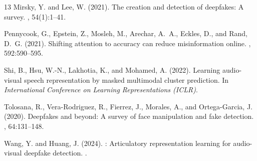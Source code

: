 \documentclass[11pt,a4paper]{article}
\begin{document}
\begin{thebibliography}{13}
Mirsky, Y. and Lee, W. (2021).
\newblock The creation and detection of deepfakes: A survey.
, 54(1):1--41.

Pennycook, G., Epstein, Z., Mosleh, M., Arechar, A.~A., Eckles, D., and Rand, D.~G. (2021).
\newblock Shifting attention to accuracy can reduce misinformation online.
, 592:590--595.

Shi, B., Hsu, W.-N., Lakhotia, K., and Mohamed, A. (2022).
\newblock Learning audio-visual speech representation by masked multimodal cluster prediction.
\newblock In {\em International Conference on Learning Representations (ICLR)}.

Tolosana, R., Vera-Rodriguez, R., Fierrez, J., Morales, A., and Ortega-Garcia, J. (2020).
\newblock Deepfakes and beyond: A survey of face manipulation and fake detection.
, 64:131--148.

Wang, Y. and Huang, J. (2024).
: Articulatory representation learning for audio-visual deepfake detection.
.

\end{thebibliography}
\end{document}
